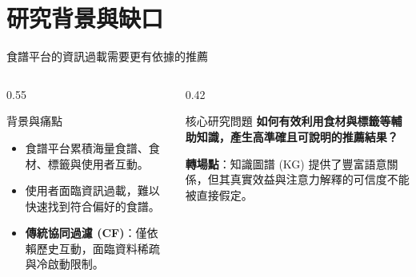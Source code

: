\documentclass[aspectratio=169, 10pt]{beamer}
\begin{document}
\section{研究背景與缺口}

\begin{frame}{食譜平台的資訊過載需要更有依據的推薦}
  \begin{columns}[T]
    \begin{column}{0.55\textwidth}
      \begin{block}{背景與痛點}
        \begin{itemize}
          \item 食譜平台累積海量食譜、食材、標籤與使用者互動。
          \item 使用者面臨資訊過載，難以快速找到符合偏好的食譜。
          \item \textbf{傳統協同過濾 (CF)}：僅依賴歷史互動，面臨資料稀疏與冷啟動限制。
        \end{itemize}
      \end{block}
    \end{column}
    \begin{column}{0.42\textwidth}
      \begin{exampleblock}{核心研究問題}
        \centering
        \vspace{0.3cm}
        \textbf{如何有效利用食材與標籤等輔助知識，產生高準確且可說明的推薦結果？}
        \vspace{0.3cm}
      \end{exampleblock}
      \vspace{0.2cm}
      \small \textbf{轉場點}：知識圖譜 (KG) 提供了豐富語意關係，但其真實效益與注意力解釋的可信度不能被直接假定。
    \end{column}
  \end{columns}
\end{frame}
\end{document}
